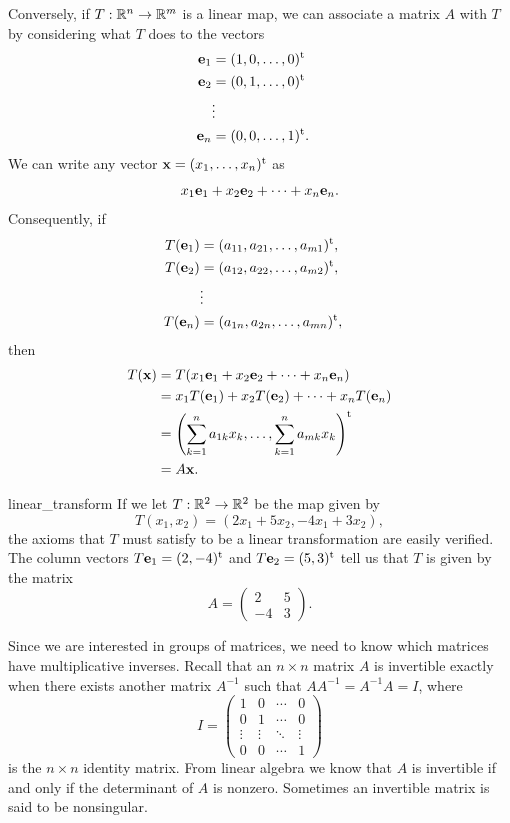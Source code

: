  
Conversely, if $T : {\Bbb R}^n \rightarrow {\Bbb R}^m$ is a linear
map, we can associate a matrix $A$ with $T$ by considering what $T$
does to the vectors 
\begin{align*}
{\bold e}_1 & = (1, 0, \ldots, 0)^{\rm t} \\
{\bold e}_2 & = (0, 1, \ldots, 0)^{\rm t} \\
            &  \vdots &  \\
{\bold e}_n & = (0, 0, \ldots, 1)^{\rm t}.
\end{align*}
We can write any vector ${\bold x} = (x_1, \ldots, x_n)^{\rm t}$ as
\[
x_1 {\bold e}_1 + x_2 {\bold e}_2 + \cdots + x_n {\bold e}_n.
\]
Consequently, if
\begin{align*}
T({\bold e}_1) & = (a_{11}, a_{21}, \ldots, a_{m1})^{\rm t}, \\
T({\bold e}_2) & = (a_{12}, a_{22}, \ldots, a_{m2})^{\rm t}, \\
            &  \vdots &  \\
T({\bold e}_n) & = (a_{1n}, a_{2n}, \ldots, a_{mn})^{\rm t},
\end{align*}
then
\begin{align*}
T({\bold x} )
& =
T(x_1 {\bold e}_1 + x_2 {\bold e}_2 + \cdots + x_n {\bold e}_n) \\
& =
x_1 T({\bold e}_1) + x_2 T({\bold e}_2) + \cdots + x_n T({\bold e}_n)
\\ 
& =
\left(
\sum_{k=1}^{n} a_{1k} x_k, \ldots,  \sum_{k=1}^{n} a_{mk} x_k
\right)^{\rm t} \\ 
& = 
A {\bold x}.
\end{align*}
 
 
\begin{example}{linear_transform}
If we let $T : {\Bbb R}^2 \rightarrow {\Bbb R}^2$ be the map given by 
\[
T(x_1, x_2) = (2 x_1 + 5 x_2, - 4 x_1 + 3 x_2),
\]
the axioms that $T$ must satisfy to be a linear transformation are
easily verified. The column vectors $T {\bold e}_1 = (2, -4)^{\rm t}$
and $T {\bold e}_2 = (5,3)^{\rm t}$  tell us that $T$ is given by the
matrix 
\[
A =
\begin{pmatrix}
2 & 5 \\
-4 & 3
\end{pmatrix}.
\]
\end{example}
 
 
Since we are interested in groups of matrices, we need to know
which matrices have multiplicative inverses. Recall that an $n \times
n$ matrix $A$ is {\bfi invertible\/} exactly
when there exists another matrix $A^{-1}$ such that $A A^{-1} = A^{-1}
A = I$, where 
\[
I =
\begin{pmatrix}
1 & 0 & \cdots & 0 \\
0 & 1 & \cdots & 0 \\
\vdots & \vdots & \ddots & \vdots \\
0 & 0 & \cdots & 1
\end{pmatrix}
\]
is the $n \times n$ identity matrix. From linear algebra we know that
$A$ is invertible if and only if the determinant of $A$ is nonzero.
Sometimes an invertible matrix is said to be {\bfi
nonsingular}. 
 
